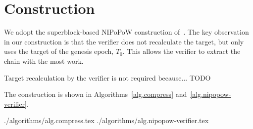 \section{Construction}

We adopt the superblock-based NIPoPoW construction of~\cite{logspace}. The key
observation in our construction is that the verifier does not recalculate the
target, but only uses the target of the genesis epoch, $T_0$. This allows the
verifier to extract the chain with the most work.

Target recalculation by the verifier is not required because... TODO

The construction is shown in Algorithms~\ref{alg.compress}
and~\ref{alg.nipopow-verifier}.

{./algorithms/alg.compress.tex}
{./algorithms/alg.nipopow-verifier.tex}
